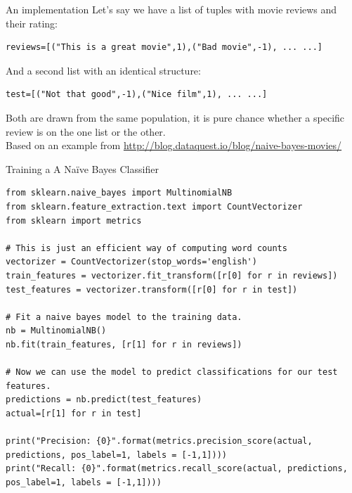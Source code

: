 \documentclass[handout]{beamer}
\begin{document}
\begin{frame}[fragile]{An implementation}
Let's say we have a list of tuples with movie reviews and their rating:
\begin{lstlisting}
reviews=[("This is a great movie",1),("Bad movie",-1), ... ...]
\end{lstlisting}
And a second list with an identical structure:
\begin{lstlisting}
test=[("Not that good",-1),("Nice film",1), ... ...]
\end{lstlisting}
Both are drawn from the same population, it is pure chance whether a specific review is on the one list or the other.\\
\tiny{Based on an example from \url{http://blog.dataquest.io/blog/naive-bayes-movies/}}
\end{frame}


\begin{frame}[fragile]{Training a A Naïve Bayes Classifier}
\begin{lstlisting}
from sklearn.naive_bayes import MultinomialNB
from sklearn.feature_extraction.text import CountVectorizer
from sklearn import metrics

# This is just an efficient way of computing word counts
vectorizer = CountVectorizer(stop_words='english')
train_features = vectorizer.fit_transform([r[0] for r in reviews])
test_features = vectorizer.transform([r[0] for r in test])

# Fit a naive bayes model to the training data.
nb = MultinomialNB()
nb.fit(train_features, [r[1] for r in reviews])

# Now we can use the model to predict classifications for our test features.
predictions = nb.predict(test_features)
actual=[r[1] for r in test]

print("Precision: {0}".format(metrics.precision_score(actual, predictions, pos_label=1, labels = [-1,1])))
print("Recall: {0}".format(metrics.recall_score(actual, predictions, pos_label=1, labels = [-1,1])))
\end{lstlisting}
\end{frame}
%
\end{document}
